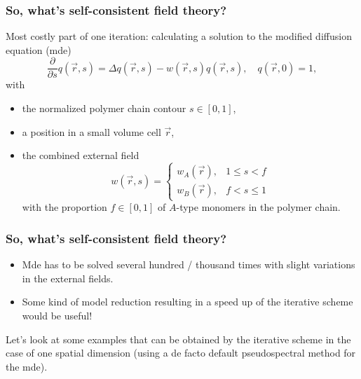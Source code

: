 \begin{frame}[t]
    \frametitle{So, what's self-consistent field theory?}

    Most costly part of one iteration:
    calculating a solution to the modified diffusion equation (mde)
        \begin{equation}
            \frac{\partial}{\partial s}q(\vec{r}, s) = \Delta q(\vec{r}, s) - w(\vec{r}, s)q(\vec{r}, s), \quad q(\vec{r}, 0) = 1,
        \end{equation}
    with
    \begin{itemize}
        \item the normalized polymer chain contour $s \in [0, 1]$,
        \item a position in a small volume cell $\vec{r}$,
        \item the combined external field
        \begin{equation}
            w(\vec{r}, s) = \begin{cases}
                w_{A}(\vec{r}), & 1 \leq s < f \\
                w_{B}(\vec{r}), & f < s \leq 1
            \end{cases}
        \end{equation}
        with the proportion $f \in [0, 1]$ of $A$-type monomers in the polymer chain.
    \end{itemize}
\end{frame}

\begin{frame}[t]
    \frametitle{So, what's self-consistent field theory?}

    \vfill

    \begin{itemize}
        \item Mde has to be solved several hundred / thousand times with slight variations in the external fields.
        \item {} Some kind of model reduction resulting in a speed up of the iterative scheme would be useful!
    \end{itemize}

    \vfill
    Let's look at some examples that can be obtained by the iterative scheme in the case of one spatial dimension
    (using a de facto default pseudospectral method for the mde).
    \vfill
\end{frame}

